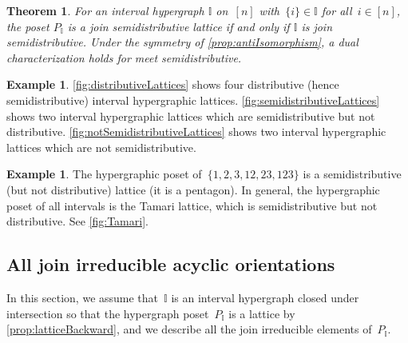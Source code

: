 \documentclass{amsart}
\newtheorem{theoremA}{Theorem}
\theoremstyle{definition}
\newtheorem{example}[theorem]{Example}
\newtheorem{notation}[theorem]{Notation}
\newcommand{\cal}[1]{\mathcal{#1}} %
\newcommand{\bigset}[2]{\big\{ #1 \;|\; #2 \big\}} %
\newcommand{\ssm}{\smallsetminus} %
\newcommand{\eqdef}{\mbox{\,\raisebox{0.2ex}{\scriptsize\ensuremath{\mathrm:}}\ensuremath{=}\,}} %
\newcommand{\II}{\mathbb I} %
\newcommand{\cIJ}{\cal{IJ}} %
\begin{document}
\begin{theoremA}
For an interval hypergraph $\II$ on~$[n]$ with~$\{i\} \in \II$ for all~$i \in [n]$, the poset $P_\II$ is a join semidistributive lattice if and only if $\II$ is join semidistributive.
Under the symmetry of \cref{prop:antiIsomorphism}, a dual characterization holds for meet semidistributive.
\end{theoremA}

\begin{example}
\cref{fig:distributiveLattices} shows four distributive (hence semidistributive) interval hypergraphic lattices.
%
\cref{fig:semidistributiveLattices} shows two interval hypergraphic lattices which are semidistributive but not distributive.
%
\cref{fig:notSemidistributiveLattices} shows two interval hypergraphic lattices which are not semidistributive.
\end{example}

\begin{example}
The hypergraphic poset of~$\{ 1, 2, 3, 12, 23, 123 \}$ is a semidistributive (but not distributive) lattice (it is a pentagon).
In general, the hypergraphic poset of all intervals is the Tamari lattice, which is semidistributive but not distributive.
See \cref{fig:Tamari}.
\end{example}


\subsection{All join irreducible acyclic orientations}
\label{subsec:joinIrreducibles}

In this section, we assume that~$\II$ is an interval hypergraph closed under intersection so that the hypergraph poset~$P_\II$ is a lattice  by \cref{prop:latticeBackward}, and we describe all the join irreducible elements of~$P_\II$. %

%
\end{document}
